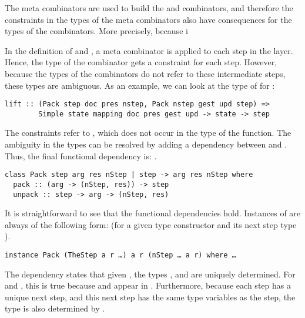 \documentclass[preprint,natbib]{sigplanconf}
\begin{document}
\bc
The meta combinators are used to build the  and  combinators, and therefore the constraints in the types of the meta combinators also have consequences for the types of the combinators. More precisely, because i
\ec

In the definition of  and , a meta combinator is applied to each step in the layer. Hence, the type of the combinator gets a constraint for each step. However, because the types of the combinators do not refer to these intermediate steps, these types are ambiguous. As an example, we can look at the type of  for :

\begin{small}
\begin{verbatim}
lift :: (Pack step doc pres nstep, Pack nstep gest upd step) =>
        Simple state mapping doc pres gest upd -> state -> step
\end{verbatim}
\end{small}

The  constraints refer to , which does not occur in the type of the function. The ambiguity in the types can be resolved by adding a dependency between  and . Thus, the final functional dependency is: . 

\begin{small}
\begin{verbatim} 
class Pack step arg res nStep | step -> arg res nStep where
  pack :: (arg -> (nStep, res)) -> step
  unpack :: step -> arg -> (nStep, res)
\end{verbatim}
\end{small}

It is straightforward to see that the functional dependencies hold. Instances of  are always of the following form: (for a given type constructor  and its next step type ).

{\tt instance Pack (TheStep a r \dots) a r (nStep \dots~a r) where \dots}

 The dependency states that given , the types ,  and  are uniquely determined. For  and , this is true because  and  appear in . Furthermore, because each step has a unique next step, and this next step has the same type variables as the step, the type  is also determined by . 
 
\end{document}
